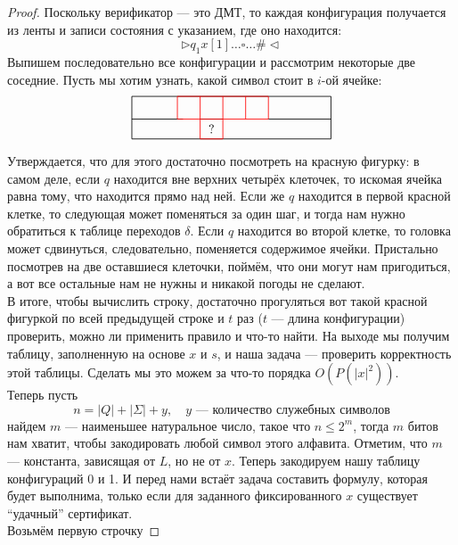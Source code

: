 \documentclass[11pt]{article}
\begin{document}
\begin{proof}
    Поскольку верификатор --- это ДМТ, то каждая конфигурация получается из ленты и записи состояния с указанием, где оно находится:
    \[\rhd q_1 x[1] \dots \square \dots \# \lhd\]
    Выпишем последовательно все конфигурации и рассмотрим некоторые две соседние. Пусть мы хотим узнать, какой символ стоит в $i$-ой ячейке: 
    \[\begin{tikzpicture}[scale=0.8, line width=0.6pt]
        \draw (0,0) rectangle (7,1.5);
        \draw[red] (1.6,1.5) -- (4.8,1.5);
        \draw (0,0.7) -- (1.8,0.7);
        \draw[red] (1.6,0.7) -- (2.4,0.7);
        \draw (2.4,0.7) -- (3.2,0.7);
        \draw[red] (3.2,0.7) -- (4.8,0.7);
        \draw (4.8,0.7) -- (7,0.7);
        \foreach \x in {1.6,2.4,3.2,4.0,4.8}
            \draw[red] (\x,0.7) -- (\x,1.5);
        \draw[red] (2.4,0) rectangle (3.2,0.7);
        \node at (2.8,0.35) {$?$};
    \end{tikzpicture}\]
    Утверждается, что для этого достаточно посмотреть на красную фигурку: в самом деле, если $q$ находится вне верхних четырёх клеточек, то искомая ячейка 
    равна тому, что находится прямо над ней. Если же $q$ находится в первой красной клетке, то следующая может поменяться за один шаг, и тогда нам нужно
    обратиться к таблице переходов $\delta$. Если $q$ находится во второй клетке, то головка может сдвинуться, следовательно, поменяется содержимое ячейки.
    Пристально посмотрев на две оставшиеся клеточки, поймём, что они могут нам пригодиться, а вот все остальные нам не нужны и никакой погоды не сделают. \\ 
    В итоге, чтобы вычислить строку, достаточно прогуляться вот такой красной фигуркой по всей предыдущей строке и $t$ раз ($t$ --- длина конфигурации) 
    проверить, можно ли применить правило и что-то найти. На выходе мы получим таблицу, заполненную на основе $x$ и $s$, и наша задача --- проверить корректность этой таблицы.
    Сделать мы это можем за что-то порядка $O(P(|x|^2))$. \\ Теперь пусть \[n = |Q| + |\Sigma| + y, \quad y \text{ --- количество служебных символов} \]
    найдем $m$ --- наименьшее натуральное число, такое что $n \leq 2^m$, тогда $m$ битов нам хватит, чтобы закодировать любой символ этого алфавита.
    Отметим, что $m$ --- константа, зависящая от $L$, но не от $x$. Теперь закодируем нашу таблицу конфигураций 0 и 1. И перед нами встаёт задача 
    составить формулу, которая будет выполнима, только если для заданного фиксированного $x$ существует ``удачный'' сертификат. \\ Возьмём первую строчку

\end{proof}
\end{document}
